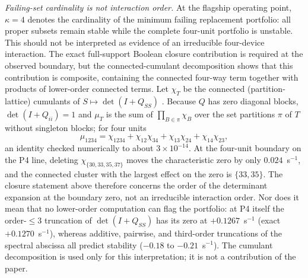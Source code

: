 \documentclass[journal]{IEEEtran}
\theoremstyle{definition}
\theoremstyle{remark}
\begin{document}
\emph{Failing-set cardinality is not interaction order.} At the flagship
operating point, $\kappa=4$ denotes the cardinality of the minimum failing
replacement portfolio: all proper subsets remain stable while the complete
four-unit portfolio is unstable. This should not be interpreted as evidence of
an irreducible four-device interaction. The exact full-support Boolean closure
contribution is required at the observed boundary, but the connected-cumulant
decomposition shows that this contribution is composite, containing the
connected four-way term together with products of lower-order connected terms.
Let $\chi_T$ be the connected (partition-lattice) cumulants of
$S\mapsto\det(I+Q_{SS})$ \cite{rota1964mobius, stanley1996combinatorics}.
Because $Q$ has zero diagonal blocks, $\det(I+Q_{ii})=1$ and $\mu_T$ is the sum
of $\prod_{B\in\pi}\chi_B$ over the set partitions $\pi$ of $T$ without
singleton blocks; for four units
\[
\mu_{1234}=\chi_{1234}+\chi_{12}\chi_{34}+\chi_{13}\chi_{24}+\chi_{14}\chi_{23},
\]
an identity checked numerically to about $3\times10^{-14}$. At the four-unit
boundary on the P4 line, deleting $\chi_{\{30,33,35,37\}}$ moves the
characteristic zero by only $0.024$~s$^{-1}$, and the connected cluster with
the largest effect on the zero is $\{33,35\}$. The closure statement above therefore concerns the
order of the determinant expansion at the boundary zero, not an irreducible
interaction order. Nor does it mean that no lower-order computation can flag the
portfolio: at P4 itself the order-$\le3$ truncation of $\det(I+Q_{SS})$ has its
zero at $+0.1267$~s$^{-1}$ (exact $+0.1270$~s$^{-1}$), whereas additive,
pairwise, and third-order truncations of the spectral abscissa all predict
stability ($-0.18$ to $-0.21$~s$^{-1}$). The cumulant decomposition is used
only for this interpretation; it is not a contribution of the paper.
\end{document}

